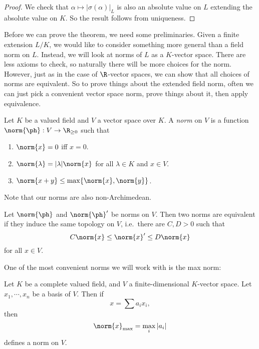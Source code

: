 \documentclass[a4paper]{article}
\begin{document}
\begin{proof}
  We check that $\alpha \mapsto |\sigma(\alpha)|_L$ is also an absolute value on $L$ extending the absolute value on $K$. So the result follows from uniqueness.
\end{proof}

Before we can prove the theorem, we need some preliminaries. Given a finite extension $L/K$, we would like to consider something more general than a field norm on $L$. Instead, we will look at norms of $L$ as a $K$-vector space. There are less axioms to check, so naturally there will be more choices for the norm. However, just as in the case of $\R$-vector spaces, we can show that all choices of norms are equivalent. So to prove things about the extended field norm, often we can just pick a convenient vector space norm, prove things about it, then apply equivalence.

\begin{defi}
  Let $K$ be a valued field and $V$ a vector space over $K$. A \emph{norm} on $V$ is a function $\norm{\ph}: V \to \R_{\geq 0}$ such that
  \begin{enumerate}
    \item $\norm{x} = 0$ iff $x = 0$.
    \item $\norm{\lambda} = |\lambda|\norm{x}$ for all $\lambda \in K$ and $x \in V$.
    \item $\norm{x + y} \leq \max \{\norm{x}, \norm{y}\}$.
  \end{enumerate}
\end{defi}
Note that our norms are also non-Archimedean.

\begin{defi}
  Let $\norm{\ph}$ and $\norm{\ph}'$ be norms on $V$. Then two norms are equivalent if they induce the same topology on $V$, i.e.\ there are $C, D > 0$ such that
  \[
    C\norm{x} \leq \norm{x}'\leq D\norm{x}
  \]
  for all $x \in V$.
\end{defi}

One of the most convenient norms we will work with is the max norm:
\begin{eg}
  Let $K$ be a complete valued field, and $V$ a finite-dimensional $K$-vector space. Let $x_1, \cdots, x_n$ be a basis of $V$. Then if
  \[
    x = \sum a_i x_i,
  \]
  then
  \[
    \norm{x}_{\mathrm{max}} = \max_i |a_i|
  \]
  defines a norm on $V$.
\end{eg}
\end{document}
